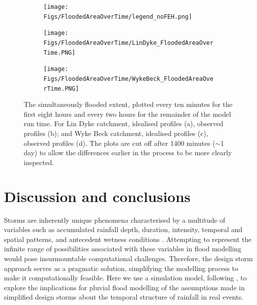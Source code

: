\documentclass[APA,Times2COL]{WileyNJDv5}
\begin{document}
\begin{figure}[!t] 
\begin{subfigure}[H]{\linewidth}
\texttt{[image: Figs/FloodedAreaOverTime/legend\_noFEH.png]}
 \end{subfigure}
\begin{subfigure}[H]{\linewidth}
\texttt{[image: Figs/FloodedAreaOverTime/LinDyke\_FloodedAreaOverTime.PNG]}
 \end{subfigure}
\begin{subfigure}[H]{\linewidth}
\texttt{[image: Figs/FloodedAreaOverTime/WykeBeck\_FloodedAreaOverTime.PNG]}
 \end{subfigure}
  \caption{The simultaneously flooded extent, plotted every ten minutes for the first eight hours and every two hours for the remainder of the model run time. For Lin Dyke catchment, idealised profiles (a), observed profiles (b); and Wyke Beck catchment, idealised profiles (c), observed profiles (d). The plots are cut off after 1400 minutes ($\sim$1 day) to allow the differences earlier in the process to be more clearly inspected. }\label{fig:flooded_area_over_time} 
\end{figure}

\section{Discussion and conclusions}\label{sec:discussion}

Storms are inherently unique phenomena characterised by a multitude of variables such as accumulated rainfall depth, duration, intensity, temporal and spatial patterns, and antecedent wetness conditions \citep{loveridge2018monte}. Attempting to represent the infinite range of possibilities associated with these variables in flood modelling would pose insurmountable computational challenges. Therefore, the design storm approach serves as a pragmatic solution, simplifying the modelling process to make it computationally feasible. Here we use a simulation model, following \citet{beven1989changing}, to explore the implications for pluvial flood modelling of the assumptions made in simplified design storms about the temporal structure of rainfall in real events. 
\end{document}
